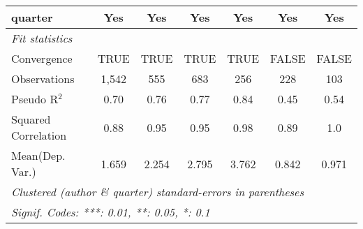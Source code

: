 \begin{tabular}{lcccccc}
   quarter                                                    & Yes           & Yes           & Yes           & Yes        & Yes          & Yes\\  
   \midrule
   \emph{Fit statistics}\\
   Convergence                                                &TRUE           & TRUE          & TRUE          & TRUE       & FALSE        & FALSE\\  
   Observations                                               & 1,542         & 555           & 683           & 256        & 228          & 103\\  
   Pseudo R$^2$                                               & 0.70          & 0.76          & 0.77          & 0.84       & 0.45         & 0.54\\  
   Squared Correlation                                        & 0.88          & 0.95          & 0.95          & 0.98       & 0.89         & 1.0\\  
Mean(Dep. Var.) & 1.659 & 2.254 & 2.795 & 3.762 & 0.842 & 0.971 \\
   \midrule \midrule
   \multicolumn{7}{l}{\emph{Clustered (author \& quarter) standard-errors in parentheses}}\\
   \multicolumn{7}{l}{\emph{Signif. Codes: ***: 0.01, **: 0.05, *: 0.1}}\\
\end{tabular}
\par\endgroup
